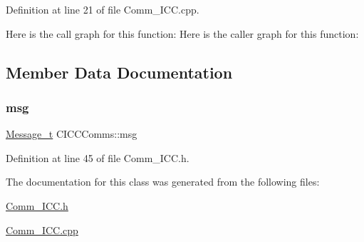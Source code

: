 Definition at line 21 of file Comm\+\_\+\+I\+C\+C.\+cpp.

Here is the call graph for this function\+:
Here is the caller graph for this function\+:


\subsection{Member Data Documentation}
\mbox{\label{class_c_i_c_c_comms_a35a59d11110d830b70ab5e2a5644bbb9}} 
\subsubsection{\texorpdfstring{msg}{msg}}
{\footnotesize\ttfamily \mbox{\hyperlink{struct_c_i_c_c_comms_1_1_message__t}{Message\+\_\+t}} C\+I\+C\+C\+Comms\+::msg}



Definition at line 45 of file Comm\+\_\+\+I\+C\+C.\+h.



The documentation for this class was generated from the following files\+:\begin{DoxyCompactItemize}
\item 
\mbox{\hyperlink{_comm___i_c_c_8h}{Comm\+\_\+\+I\+C\+C.\+h}}\item 
\mbox{\hyperlink{_comm___i_c_c_8cpp}{Comm\+\_\+\+I\+C\+C.\+cpp}}\end{DoxyCompactItemize}
